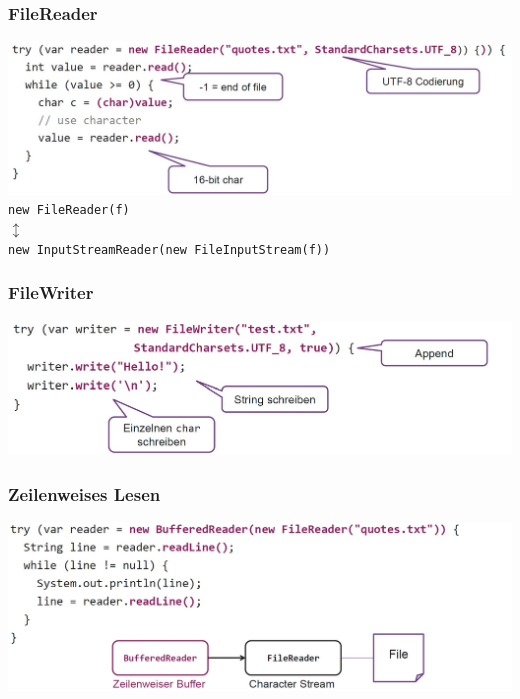 {    \subsubsection{FileReader}
        \includegraphics[width=0.9\linewidth]{pictures/filereader.jpg}\\
        \verb|new FileReader(f)| \\
        $\updownarrow$ \\
        \verb|new InputStreamReader(new FileInputStream(f))|
        \vspace{-0.3cm}

    \subsubsection{FileWriter}
        \includegraphics[width=0.8\linewidth]{pictures/filewriter.jpg}
        \vspace{-0.3cm}

    \subsubsection{Zeilenweises Lesen}
        \includegraphics[width=0.8\linewidth]{pictures/zeilenweise.jpg}
        \vspace{-0.3cm}

}
